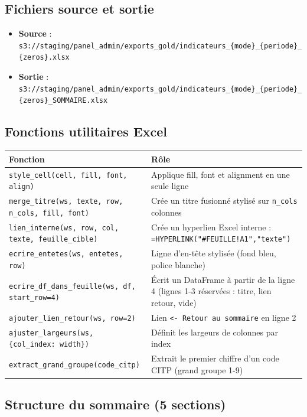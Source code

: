 \documentclass[12pt,a4paper,french]{report}
\newcommand{\bucket}[1]{\texttt{s3://#1}}
\begin{document}
\subsection{Fichiers source et sortie}

\begin{itemize}[nosep]
  \item \textbf{Source} :
        \bucket{staging/panel\_admin/exports\_gold/indicateurs\_\{mode\}\_\{periode\}\_\{zeros\}.xlsx}
  \item \textbf{Sortie} :
        \bucket{staging/panel\_admin/exports\_gold/indicateurs\_\{mode\}\_\{periode\}\_\{zeros\}\_SOMMAIRE.xlsx}
\end{itemize}

\subsection{Fonctions utilitaires Excel}

\begin{tabularx}{\textwidth}{lX}
  \toprule
  \textbf{Fonction} & \textbf{Rôle} \\
  \midrule
  \texttt{style\_cell(cell, fill, font, align)} &
    Applique fill, font et alignment en une seule ligne \\
  \texttt{merge\_titre(ws, texte, row, n\_cols, fill, font)} &
    Crée un titre fusionné stylisé sur \texttt{n\_cols} colonnes \\
  \texttt{lien\_interne(ws, row, col, texte, feuille\_cible)} &
    Crée un hyperlien Excel interne :
    \texttt{=HYPERLINK("\#FEUILLE!A1","texte")} \\
  \texttt{ecrire\_entetes(ws, entetes, row)} &
    Ligne d'en-tête stylisée (fond bleu, police blanche) \\
  \texttt{ecrire\_df\_dans\_feuille(ws, df, start\_row=4)} &
    Écrit un DataFrame à partir de la ligne 4 (lignes 1-3 réservées :
    titre, lien retour, vide) \\
  \texttt{ajouter\_lien\_retour(ws, row=2)} &
    Lien \texttt{<- Retour au sommaire} en ligne 2 \\
  \texttt{ajuster\_largeurs(ws, \{col\_index: width\})} &
    Définit les largeurs de colonnes par index \\
  \texttt{extract\_grand\_groupe(code\_citp)} &
    Extrait le premier chiffre d'un code CITP (grand groupe 1-9) \\
  \bottomrule
\end{tabularx}

\subsection{Structure du sommaire (5 sections)}
\end{document}
